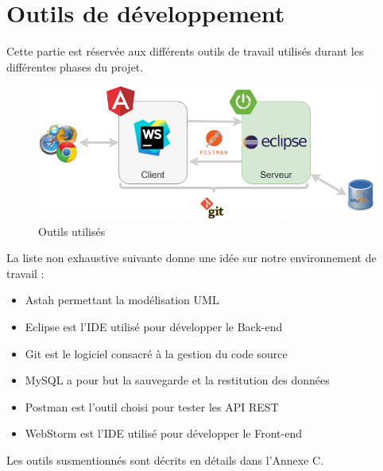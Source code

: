 \section{Outils de développement}
Cette partie est réservée aux différents outils de travail utilisés durant les différentes phases du projet.

\begin{figure}[h!]  
 \centering
    \includegraphics[width=1\textwidth]{chapitre5/Figures/outils.png}
  \caption{Outils utilisés}
\end{figure}

La liste non exhaustive suivante donne une idée sur notre environnement de travail :
\begin{itemize}[label=\textbullet]
  \item Astah permettant la modélisation UML
  \item Eclipse est l'IDE utilisé pour développer le Back-end
  \item Git est le logiciel consacré à la gestion du code source
  \item MySQL a pour but la sauvegarde et la restitution des données
  \item Postman est l'outil choisi pour tester les API REST
  \item WebStorm est l'IDE utilisé pour développer le Front-end
\end{itemize}

Les outils susmentionnés sont décrits en détails dans l'Annexe C.